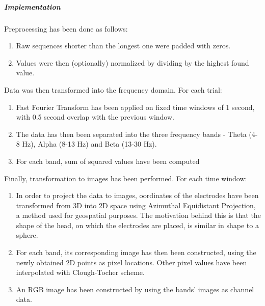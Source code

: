 \documentclass{article}
\begin{document}
\subparagraph{Implementation} Preprocessing has been done as follows:

\begin{enumerate}
 \item Raw sequences shorter than the longest one were padded with zeros.
 \item Values were then (optionally) normalized by dividing by the highest found value.
\end{enumerate}
Data was then transformed into the frequency domain. For each trial:
\begin{enumerate}[resume]
 \item Fast Fourier Transform has been applied on fixed time windows of 1 second, with 0.5 second overlap 		with the previous window.
 \item The data has then been separated into the three frequency bands - Theta (4-8 Hz), Alpha (8-13 Hz) and Beta (13-30 Hz).
 \item For each band, sum of squared values have been computed
\end{enumerate}
Finally, transformation to images has been performed. For each time window:
\begin{enumerate}[resume]
 \item In order to project the data to images, oordinates of the electrodes have been transformed from 3D into 2D space using Azimuthal Equidistant Projection, a method used for geospatial purposes.
 The motivation behind this is that the shape of the head, on which the electrodes are placed, is similar in shape to a sphere.
 \item For each band, its corresponding image has then been constructed, using the newly obtained 2D points as pixel locations. Other pixel values have been interpolated with Clough-Tocher scheme.
 \item An RGB image has been constructed by using the bands' images as channel data.  
\end{enumerate}
\end{document}
